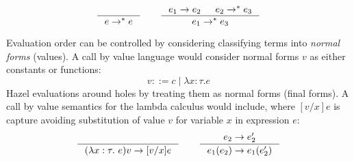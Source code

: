 \[\inference{}{e \to^{*} e}\qquad \inference{e_1 \to e_2 & e_2 \to^{*} e_3}{e_1 \to^{*} e_3}\]

Evaluation order can be controlled by considering classifying terms into \textit{normal forms} (values). A call by value language would consider normal forms $v$ as either constants or functions:
\[v ::= c \mid \lambda x : \tau. e\]
Hazel evaluations around holes by treating them as normal forms (final forms). A call by value semantics for the lambda calculus would include, where $[v/x]e$ is capture avoiding substitution of value $v$ for variable $x$ in expression $e$:
\[\inference{}{(\lambda x :\tau.\ e)v \to [v/x]e} \qquad \inference{e_2 \to e_2'}{e_1(e_2) \to e_1(e_2')}\]